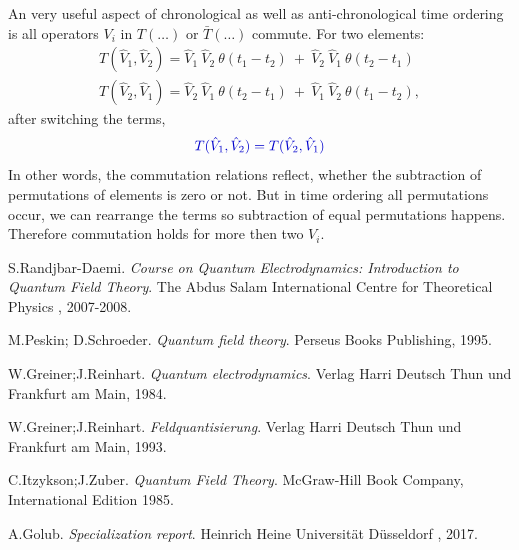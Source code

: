 \documentclass[
12pt, %
english, %
singlespacing, %
headsepline, %
]{MastersDoctoralThesis} %
\begin{document}
\begin{subappendices}
An very useful aspect of chronological as well as anti-chronological time ordering is all operators $ V_i $ in $ T(\ldots) $ or $ \bar{T}(\ldots) $ commute. For two elements:
\begin{subequations}
\begin{align}
T(\hat{V}_1, \hat{V}_2)=\hat{V}_1\ \hat{V}_2\ \theta (t_1 -t_2)\ +\ \hat{V}_2\  \hat{V}_1 \ \theta (t_2-t_1)
\\
T(\hat{V}_2, \hat{V}_1)=\hat{V}_2\ \hat{V}_1\ \theta (t_2 -t_1)\ +\ \hat{V}_1\  \hat{V}_2 \ \theta (t_1-t_2)
,
\end{align}
\end{subequations}
after switching the terms,
\begin{equation}\textcolor[RGB]{0,0,204}{
T(\hat{V}_1, \hat{V}_2)=T(\hat{V}_2, \hat{V}_1)
}
\end{equation}
In other words, the commutation relations reflect, whether the subtraction of permutations of elements is zero or not. But in time ordering all permutations occur, we can rearrange the terms so subtraction of equal permutations happens. Therefore commutation holds for more then two $ V_i $.
\end{subappendices}
\newpage
\begin{thebibliography}{12}
S.Randjbar-Daemi.
\textit{Course on Quantum Electrodynamics: Introduction to Quantum Field Theory}.
 The Abdus Salam International Centre for Theoretical Physics , 2007-2008.
 
M.Peskin; D.Schroeder. 
\textit{Quantum field theory}. 
Perseus Books Publishing, 1995.
 
W.Greiner;J.Reinhart.
\textit{Quantum electrodynamics}.
 Verlag Harri Deutsch Thun und Frankfurt am Main, 1984.
 
W.Greiner;J.Reinhart.
\textit{Feldquantisierung}.
 Verlag Harri Deutsch Thun und Frankfurt am Main, 1993.
 
C.Itzykson;J.Zuber.
\textit{Quantum Field Theory}.
 McGraw-Hill Book Company, International Edition 1985. 
 
A.Golub.
\textit{Specialization report}.
 Heinrich Heine Universität Düsseldorf , 2017. 
\end{thebibliography}



%
%
%



\end{document}
